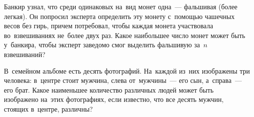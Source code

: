 \begin{problems}
\item
Банкир узнал, что среди одинаковых на~вид монет одна~--- фальшивая
(более легкая).
Он попросил эксперта определить эту монету с~помощью чашечных весов без гирь,
причем потребовал, чтобы каждая монета участвовала во~взвешиваниях не~более
двух раз.
Какое наибольшее число монет может быть у~банкира, чтобы эксперт заведомо смог
выделить фальшивую за~$n$ взвешиваний? 

\item
В~семейном альбоме есть десять фотографий.
На~каждой из~них изображены три человека: в~центре стоит мужчина, слева
от~мужчины~--- его сын, а~справа~--- его брат.
Какое наименьшее количество различных людей может быть изображено на~этих
фотографиях, если известно, что все десять мужчин, стоящих в~центре, различны?

\end{problems}

